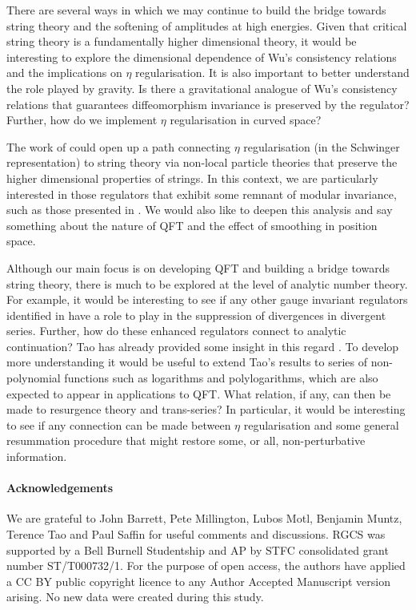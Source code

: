 \documentclass[12pt, letter]{article}
\begin{document}
There are several ways in which we may continue to build the bridge towards string theory and the softening of amplitudes at high energies.  Given that critical string theory is a fundamentally higher dimensional theory, it would be interesting to explore the dimensional dependence of Wu's consistency relations and the implications on $\eta$ regularisation. It is also important to better understand the role played by gravity.  Is there a gravitational analogue of Wu's consistency relations that guarantees diffeomorphism invariance is preserved by the regulator? Further, how do we implement  $\eta$ regularisation in curved space? 

The work of \citep{Abel19,Abel20} could open up a path connecting $\eta$ regularisation (in the Schwinger representation) to string theory via non-local particle theories that preserve the higher dimensional properties of strings.  In this context, we are particularly interested in those regulators  that exhibit some remnant of modular invariance, such as those presented in \citep{Abel21}. We would also like to deepen this analysis and  say something about the nature of QFT and the effect of smoothing in position space. 



Although our main focus is on developing QFT and building a bridge towards string theory, there is much to be explored at the level of analytic number theory. For example, it would be interesting to see if any other gauge invariant regulators identified in \cite{PadillaSmith23} have a role to play in the suppression of divergences in divergent series. Further, how do these enhanced regulators connect to analytic continuation? Tao has already provided some insight in this regard \cite{Tao11}. To develop  more understanding it would be useful to extend Tao's results to series of non-polynomial functions such as logarithms and polylogarithms, which are also expected to appear in applications to QFT. What relation, if any, can then be made to resurgence theory and trans-series? In particular, it would be interesting to see if any connection can be made between $\eta$ regularisation and some general resummation procedure that might restore some, or all, non-perturbative information. 


\paragraph{Acknowledgements} 
We are grateful to John Barrett, Pete Millington, Lubos Motl, Benjamin Muntz, Terence Tao and Paul Saffin for useful comments and discussions. RGCS was supported by a Bell Burnell Studentship and AP  by STFC consolidated grant number ST/T000732/1.  For the purpose of open access, the authors have applied a CC BY public copyright licence to any Author Accepted Manuscript version arising. No new data were created during this study.

\appendix


\end{document}
